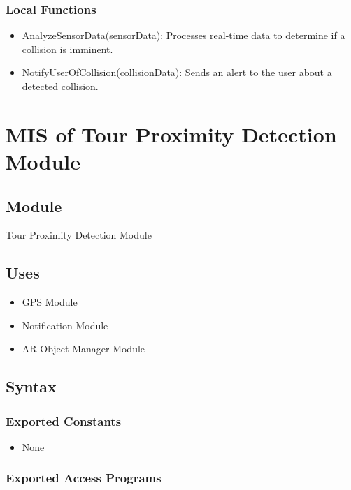\documentclass[12pt, titlepage]{article}
\begin{document}
\subsubsection{Local Functions}

\begin{itemize}
  \item AnalyzeSensorData(sensorData): Processes real-time data to determine if a collision is imminent.
  \item NotifyUserOfCollision(collisionData): Sends an alert to the user about a detected collision.
\end{itemize}

\newpage

\section{MIS of Tour Proximity Detection Module} \label{Module_TourProximityDetection}

\subsection{Module}

Tour Proximity Detection Module

\subsection{Uses}

\begin{itemize}
  \item GPS Module
  \item Notification Module
  \item AR Object Manager Module
\end{itemize}

\subsection{Syntax}

\subsubsection{Exported Constants}

\begin{itemize}
  \item None
\end{itemize}

\subsubsection{Exported Access Programs}
\end{document}
